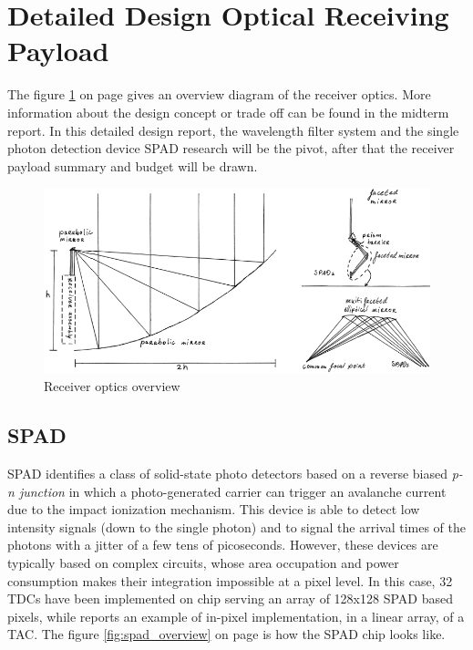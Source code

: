 \section{Detailed Design Optical Receiving Payload}
\label{sec:DDreceiver}
The figure \ref{fig:receiver_overview} on page \pageref{fig:receiver_overview} gives an overview diagram of the receiver optics.  More information about the design concept or trade off can be found in the midterm report. In this detailed design report, the wavelength filter system and the single photon detection device \acs{SPAD} research will be the pivot, after that the receiver payload summary and budget will be drawn.

\begin{figure}[ht!]
\centering
\includegraphics[scale = 0.5]{chapters/img/DiagramReceiverGeneral.png}
\caption{Receiver optics overview}
\label{fig:receiver_overview}
\end{figure} 

\subsection{\ac{SPAD}}
\label{SPAD}
\ac{SPAD} identifies a class of solid-state photo detectors based on a reverse biased \textit{p-n junction} in which a photo-generated carrier can trigger an avalanche current due to the impact ionization mechanism. This device is able to detect low intensity signals (down to the single photon) and to signal the arrival times of the photons with a jitter of a few tens of picoseconds. However, these devices are typically based on complex circuits, whose area occupation and power consumption makes their integration impossible at a pixel level. In this case, 32 \ac{TDC}s have been implemented on chip serving an array of 128x128 SPAD based pixels, while reports an example of in-pixel implementation, in a linear array, of a \ac{TAC}\cite{SPAD3}. The figure \ref{fig:spad_overview} on page \pageref{fig:spad_overview} is how the \acs{SPAD} chip looks like.

